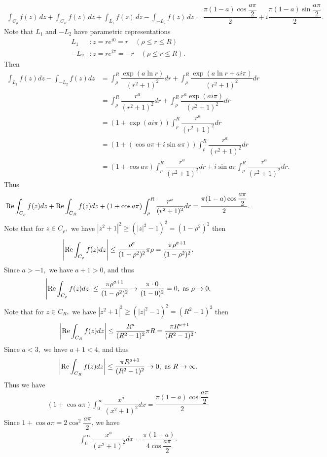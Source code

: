 \begin{problem}
\begin{solution}
\begin{align*}
    \int_{C_\rho} f(z) \,dz + \int_{C_R} f(z) \,dz + \int_{L_1} f(z) \,dz - \int_{-L_2} f(z) \,dz = \dfrac{\pi(1-a)\cos\dfrac{a\pi}{2}}{2} + i\dfrac{\pi(1-a)\sin\dfrac{a\pi}{2}}{2}.
    \end{align*}
Note that $L_1$ and $-L_2$ have parametric representations
\begin{align*}
    L_1&:z=re^{i0}=r\quad(\rho\le r\le R)\\
    -L_2&:z=re^{i\pi}=-r\quad(\rho\le r\le R).
\end{align*}
Then 
\begin{align*}
    \int_{L_1}f(z)dz-\int_{-L_2}f(z)dz&=\int_{\rho}^R\dfrac{\exp(a\ln r)}{(r^2+1)^2}dr+\int_{\rho}^R\dfrac{\exp(a\ln r+a i\pi)}{(r^2+1)^2}dr\\
    &=\int_{\rho}^R\dfrac{r^a}{(r^2+1)^2}dr+\int_{\rho}^R\dfrac{r^a\exp(ai\pi)}{(r^2+1)^2}dr\\
    &=(1+\exp(ai\pi))\int_\rho^R\dfrac{r^a}{(r^2+1)^2}dr\\
    &=(1+(\cos a\pi+i\sin a\pi))\int_\rho^R\dfrac{r^a}{(r^2+1)^2}dr\\
        &=(1+\cos a\pi)\int_\rho^R\dfrac{r^a}{(r^2+1)^2}dr+ i\sin a\pi\int_\rho^R\dfrac{r^a}{(r^2+1)^2}dr.
\end{align*}
Thus 
\begin{align*}
    {\rm Re}  \int_{C_\rho}f(z)dz+{\rm Re}\int_{C_R}f(z)dz+(1+\cos a\pi)\int_\rho^R\dfrac{r^a}{(r^2+1)^2}dr=\dfrac{\pi(1-a)\cos\dfrac{a\pi}{2}}{2}.
\end{align*}
Note that for $z\in C_\rho,$ we have $|z^2+1|^2\ge (|z|^2-1)^2=(1-\rho^2)^2$ then 
\begin{align*}
    \left\lvert {\rm Re}  \int_{C_\rho}f(z)dz\right\rvert\le \dfrac{\rho^a}{(1-\rho^2)^2}\pi \rho=\dfrac{\pi\rho^{a+1}}{(1-\rho^2)^2}.
\end{align*}
Since $a>-1,$ we have $a+1>0$, and thus 
\begin{align*}
   \left\lvert {\rm Re}  \int_{C_\rho}f(z)dz\right\rvert\le \dfrac{\pi\rho^{a+1}}{(1-\rho^2)^2}\rightarrow\dfrac{\pi \cdot 0}{(1-0)^2}=0,\text{ as }\rho\rightarrow0.
\end{align*}
Note that for $z\in C_R,$ we have $|z^2+1|^2\ge (|z|^2-1)^2=(R^2-1)^2$ then 
\begin{align*}
    \left\lvert {\rm Re}  \int_{C_R}f(z)dz\right\rvert\le \dfrac{R^a}{(R^2-1)^2}\pi R=\dfrac{\pi R^{a+1}}{(R^2-1)^2}.
\end{align*}
Since $a<3,$ we have $a+1<4$, and thus 
\begin{align*}
   \left\lvert {\rm Re}  \int_{C_R}f(z)dz\right\rvert\le \dfrac{\pi R^{a+1}}{(R^2-1)^2}\rightarrow 0,\text{ as }R\rightarrow\infty.
\end{align*}
Thus we have 
\begin{align*}
    (1+\cos a\pi)\int_0^\infty \dfrac{x^a}{(x^2+1)^2}dx=\dfrac{\pi(1-a)\cos\dfrac{a\pi }{2}}{2}
\end{align*}
Since $1+\cos a\pi=2\cos^2 \dfrac{a\pi}{2}$, we have 
\begin{align*}
    \int_0^\infty \dfrac{x^a}{(x^2+1)^2}dx=\dfrac{\pi(1-a)}{4\cos\dfrac{a\pi}{2}}.
\end{align*}
\end{solution}
\end{problem}

